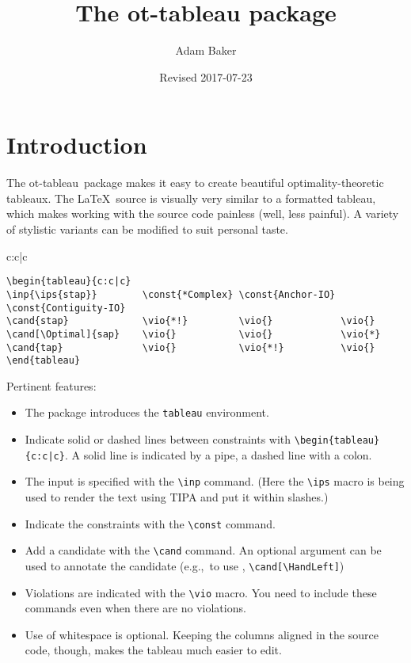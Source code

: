\documentclass{article}
\title{The \textsf{ot-tableau} package}
\date{Revised 2017-07-23}
\author{Adam Baker}
\def\eg{e.g.,~}
\def\tabl{\textsf{ot-tableau}}
\begin{document}
\maketitle

\section{Introduction}
The \tabl\ package makes it easy to create beautiful optimality-theoretic tableaux. The \LaTeX\ source is visually very similar to a formatted tableau, which makes working with the source code painless (well, less painful). A variety of stylistic variants can be modified to suit personal taste.

\begin{center}
	\begin{tableau}{c:c|c}
	          
	             \vio{*!}         \vio{}            \vio{}
	    \vio{}           \vio{}            \vio{*}
	              \vio{}           \vio{*!}          \vio{}
	\end{tableau}
\end{center}

\begin{verbatim}
\begin{tableau}{c:c|c}
\inp{\ips{stap}}        \const{*Complex} \const{Anchor-IO} \const{Contiguity-IO}
\cand{stap}             \vio{*!}         \vio{}            \vio{}
\cand[\Optimal]{sap}    \vio{}           \vio{}            \vio{*}
\cand{tap}              \vio{}           \vio{*!}          \vio{}
\end{tableau}
\end{verbatim}
Pertinent features:
\begin{itemize}
\item The package introduces the \verb+tableau+ environment.
\item Indicate solid or dashed lines between constraints with \verb+\begin{tableau}{c:c|c}+. A solid line is indicated by a pipe, a dashed line with a colon.
\item The input is specified with the \verb+\inp+ command. (Here the \verb+\ips+ macro is being used to render the text using TIPA and put it within slashes.)
\item Indicate the constraints with the \verb+\const+ command.
\item Add a candidate with the \verb+\cand+ command. An optional argument can be used to annotate the candidate (\eg to use \HandLeft, \verb+\cand[\HandLeft]+)
\item Violations are indicated with the \verb+\vio+ macro. You need to include these commands even when there are no violations.
\item Use of whitespace is optional. Keeping the columns aligned in the source code, though, makes the tableau much easier to edit.
\end{itemize}
\end{document}
